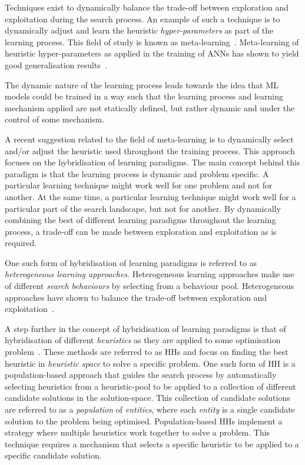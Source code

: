 Techniques exist to dynamically balance the trade-off between exploration and exploitation during the search process. An example of such a technique is to dynamically adjust and learn the heuristic \textit{hyper-parameters} as part of the learning process. This field of study is known as meta-learning~\cite{ref:giraud:2004}. Meta-learning of heuristic hyper-parameters as applied in the training of \acp{ANN} has shown to yield good generalisation results~\cite{ref:hospedales:2022, ref:vilalta:2002}.

The dynamic nature of the learning process leads towards the idea that \acs{ML} models could be trained in a way such that the learning process and learning mechanism applied are not statically defined, but rather dynamic and under the control of some mechanism.

A recent suggestion related to the field of meta-learning is to dynamically select and/or adjust the heuristic used throughout the training process. This approach focuses on the hybridisation of learning paradigms. The main concept behind this paradigm is that the learning process is dynamic and problem specific. A particular learning technique might work well for one problem and not for another. At the same time, a particular learning technique might work well for a particular part of the search landscape, but not for another. By dynamically combining the best of different learning paradigms throughout the learning process, a trade-off can be made between exploration and exploitation as is required.

One such form of hybridisation of learning paradigms is referred to as \textit{heterogeneous learning approaches}. Heterogeneous learning approaches make use of different \textit{search behaviours} by selecting from a behaviour pool. Heterogeneous approaches have shown to balance the trade-off between exploration and exploitation~\cite{ref:nepomuceno:2013}.

A step further in the concept of hybridisation of learning paradigms is that of hybridisation of different \textit{heuristics} as they are applied to some optimisation problem~\cite{ref:burke:2013}. These methods are referred to as \acfp{HH} and focus on finding the best heuristic in \textit{heuristic space} to solve a specific problem. One such form of \acs{HH} is a population-based approach that guides the search process by automatically selecting heuristics from a heuristic-pool to be applied to a collection of different candidate solutions in the solution-space. This collection of candidate solutions are referred to as a \textit{population} of \textit{entities}, where each \textit{entity} is a single candidate solution to the problem being optimised. Population-based \acp{HH} implement a strategy where multiple heuristics work together to solve a problem. This technique requires a mechanism that selects a specific heuristic to be applied to a specific candidate solution.

